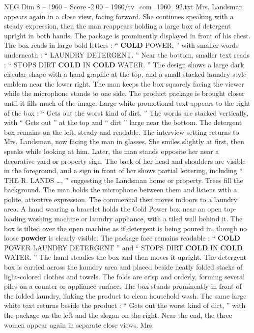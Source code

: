 \begin{textsample}{NEG Dim 8 – 1960 – Score -2.00 – 1960/tv\_com\_1960\_92.txt}
Mrs.
Landsman appears again in a close view, facing forward.
She continues speaking with a steady expression, then the man reappears holding a large box of detergent upright in both hands.
The package is prominently displayed in front of his chest.
The box reads in large bold letters : “ \textbf{COLD} POWER, ” with smaller words underneath : “ LAUNDRY DETERGENT. ” Near the bottom, smaller text reads : “ STOPS DIRT \textbf{COLD} IN \textbf{COLD} WATER. ” The design shows a large dark circular shape with a hand graphic at the top, and a small stacked-laundry-style emblem near the lower right.
The man keeps the box squarely facing the viewer while the microphone stands to one side.
The product package is brought closer until it fills much of the image.
Large white promotional text appears to the right of the box : “ Gets out the worst kind of dirt. ” The words are stacked vertically, with “ Gets out ” at the top and “ dirt ” large near the bottom.
The detergent box remains on the left, steady and readable.
The interview setting returns to Mrs.
Landsman, now facing the man in glasses.
She smiles slightly at first, then speaks while looking at him.
Later, the man stands opposite her near a decorative yard or property sign.
The back of her head and shoulders are visible in the foreground, and a sign in front of her shows partial lettering, including “ THE R.
LANDS …, ” suggesting the Landsman home or property.
Trees fill the background.
The man holds the microphone between them and listens with a polite, attentive expression.
The commercial then moves indoors to a laundry area.
A hand wearing a bracelet holds the Cold Power box near an open top-loading washing machine or laundry appliance, with a tiled wall behind it.
The box is tilted over the open machine as if detergent is being poured in, though no loose \textbf{powder} is clearly visible.
The package face remains readable : “ \textbf{COLD} POWER LAUNDRY DETERGENT ” and “ STOPS DIRT \textbf{COLD} IN \textbf{COLD} WATER. ” The hand steadies the box and then moves it upright.
The detergent box is carried across the laundry area and placed beside neatly folded stacks of light-colored clothes and towels.
The folds are crisp and orderly, forming several piles on a counter or appliance surface.
The box stands prominently in front of the folded laundry, linking the product to clean household wash.
The same large white text returns beside the product : “ Gets out the worst kind of dirt, ” with the package on the left and the slogan on the right.
Near the end, the three women appear again in separate close views.
Mrs.

\end{textsample}
